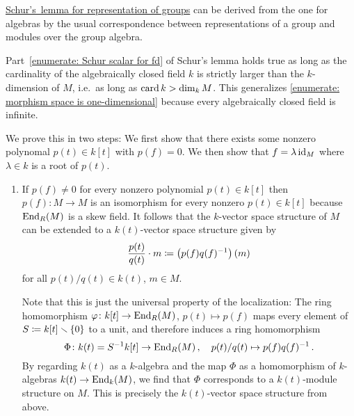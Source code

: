 \begin{remark}
  \hyperref[proposition: Schurs lemma representations]{Schur’s~lemma for representation of groups} can be derived from the one for algebras by the usual correspondence between representations of a group and modules over the group algebra.
\end{remark}


\begin{remark}
  \label{remark: Schur for cardinality big enough}
  Part~\ref{enumerate: Schur scalar for fd} of Schur’s lemma holds true as long as the cardinality of the algebraically closed field $k$ is strictly larger than the $k$-dimension of $M$, i.e.\ as long as $\operatorname{card} k > \dim_k M$.
  This generalizes \ref{enumerate: morphism space is one-dimensional} because every algebraically closed field is infinite.

  We prove this in two steps:
  We first show that there exists some nonzero polynomal $p(t) \in k[t]$ with $p(f) = 0$.
  We then show that $f = \lambda \operatorname{id}_M$ where $\lambda \in k$ is a root of $p(t)$.
  \begin{enumerate}[label=\arabic*)]
    \item
      If $p(f) \neq 0$ for every nonzero polynomial $p(t) \in k[t]$ then $p(f) \colon M \to M$ is an isomorphism for every nonzero $p(t) \in k[t]$ because $\operatorname{End}_R(M)$ is a skew field.
      It follows that the $k$-vector space structure of $M$ can be extended to a $k(t)$-vector space structure given by
      \[
                  \frac{p(t)}{q(t)} \cdot m
        \coloneqq  \left( p(f) q(f)^{-1} \right)(m)
      \]
      for all $p(t)/q(t) \in k(t)$, $m \in M$.
      
      Note that this is just the universal property of the localization:
      The ring homomorphism $\varphi \colon k[t] \to \operatorname{End}_R(M)$, $p(t) \mapsto p(f)$ maps every element of $S \coloneqq k[t] \smallsetminus \{0\}$ to a unit, and therefore induces a ring homomorphism
      \[
                \Phi
        \colon  k(t)
        =       S^{-1} k[t]
        \to     \operatorname{End}_R(M) \,,
        \quad   p(t)/q(t)
        \mapsto p(f) q(f)^{-1} \,.
      \]
      By regarding $k(t)$ as a $k$-algebra and the map $\Phi$ as a homomorphism of $k$-algebras $k(t) \to \operatorname{End}_k(M)$, we find that $\Phi$ corresponds to a $k(t)$-module structure on $M$.
      This is precisely the $k(t)$-vector space structure from above.
      

\end{enumerate}
\end{remark}
